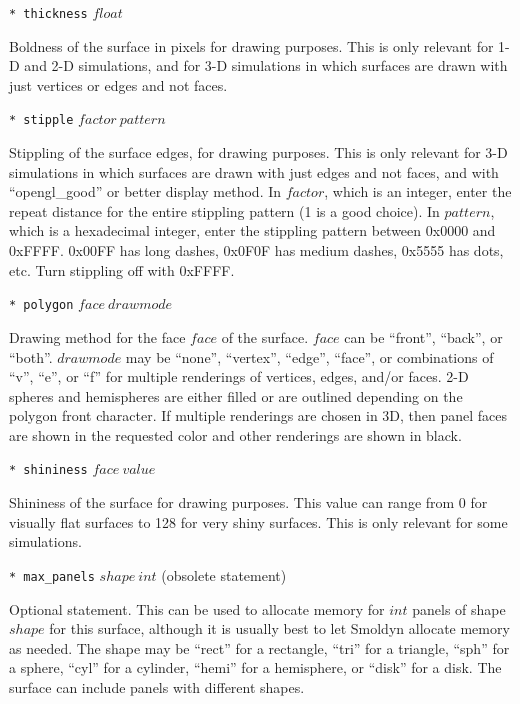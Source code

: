 \documentclass {scrbook}
\newcommand {\ttt} {\texttt}
\begin{document}
\begin{description}
\item{\ttt{* thickness} $float$}

Boldness of the surface in pixels for drawing purposes. This is only relevant for 1-D and 2-D simulations, and for 3-D simulations in which surfaces are drawn with just vertices or edges and not faces.

\item{\ttt{* stipple} $factor\ pattern$}

Stippling of the surface edges, for drawing purposes. This is only relevant for 3-D simulations in which surfaces are drawn with just edges and not faces, and with ``opengl\_good'' or better display method. In $factor$, which is an integer, enter the repeat distance for the entire stippling pattern (1 is a good choice). In $pattern$, which is a hexadecimal integer, enter the stippling pattern between 0x0000 and 0xFFFF. 0x00FF has long dashes, 0x0F0F has medium dashes, 0x5555 has dots, etc. Turn stippling off with 0xFFFF.

\item{\ttt{* polygon} $face\ drawmode$}

Drawing method for the face $face$ of the surface. $face$ can be ``front'', ``back'', or ``both''. $drawmode$ may be ``none'', ``vertex'', ``edge'', ``face'', or combinations of ``v'', ``e'', or ``f'' for multiple renderings of vertices, edges, and/or faces. 2-D spheres and hemispheres are either filled or are outlined depending on the polygon front character. If multiple renderings are chosen in 3D, then panel faces are shown in the requested color and other renderings are shown in black.

\item{\ttt{* shininess} $face\ value$}

Shininess of the surface for drawing purposes. This value can range from 0 for visually flat surfaces to 128 for very shiny surfaces. This is only relevant for some simulations.

\item{\ttt{* max\_panels} $shape\ int$ (obsolete statement)}

Optional statement. This can be used to allocate memory for $int$ panels of shape $shape$ for this surface, although it is usually best to let Smoldyn allocate memory as needed. The shape may be ``rect'' for a rectangle, ``tri'' for a triangle, ``sph'' for a sphere, ``cyl'' for a cylinder, ``hemi'' for a hemisphere, or ``disk'' for a disk. The surface can include panels with different shapes.


\end{description}
\end{document}
